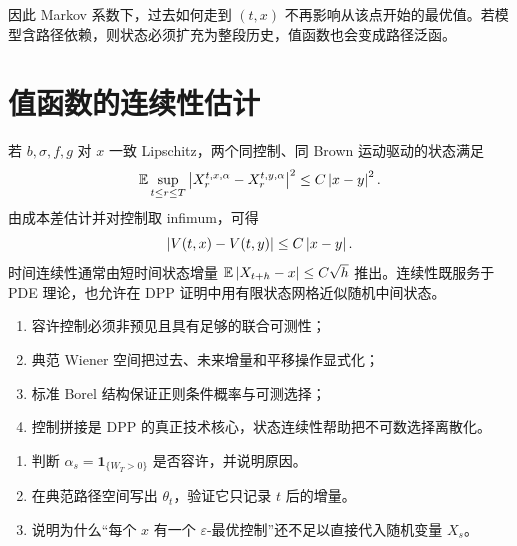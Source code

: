 因此 Markov 系数下，过去如何走到 $(t,x)$ 不再影响从该点开始的最优值。若模型含路径依赖，则状态必须扩充为整段历史，值函数也会变成路径泛函。

\section{值函数的连续性估计}

若 $b,\sigma,f,g$ 对 $x$ 一致 Lipschitz，两个同控制、同 Brown 运动驱动的状态满足
\[
\mathbb{E}\sup_{t\le r\le T}\left\lvert X_r^{t,x,\alpha}-X_r^{t,y,\alpha}\right\rvert^2
\le C\left\lvert x-y\right\rvert^2.
\]
由成本差估计并对控制取 infimum，可得
\[
\left\lvert V(t,x)-V(t,y)\right\rvert\le C\left\lvert x-y\right\rvert.
\]
时间连续性通常由短时间状态增量 $\mathbb{E}\left\lvert X_{t+h}-x\right\rvert\le C\sqrt h$ 推出。连续性既服务于 PDE 理论，也允许在 DPP 证明中用有限状态网格近似随机中间状态。

\begin{takeaway}
\begin{enumerate}
  \item 容许控制必须非预见且具有足够的联合可测性；
  \item 典范 Wiener 空间把过去、未来增量和平移操作显式化；
  \item 标准 Borel 结构保证正则条件概率与可测选择；
  \item 控制拼接是 DPP 的真正技术核心，状态连续性帮助把不可数选择离散化。
\end{enumerate}
\end{takeaway}

\begin{exercisebox}
\begin{enumerate}
  \item 判断 $\alpha_s=\mathbf 1_{\{W_T>0\}}$ 是否容许，并说明原因。
  \item 在典范路径空间写出 $\theta_t$，验证它只记录 $t$ 后的增量。
  \item 说明为什么“每个 $x$ 有一个 $\varepsilon$-最优控制”还不足以直接代入随机变量 $X_s$。
\end{enumerate}
\end{exercisebox}
